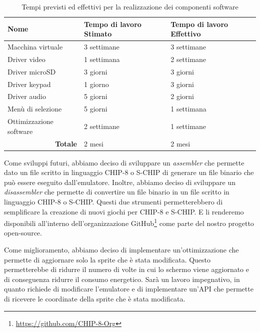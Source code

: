 \documentclass[a4paper]{article}
\begin{document}
\begin{center}
    \begin{table}[ht]
        \centering
        \begin{tabular}{|l|l|l|}
            \hline
            \textbf{Nome}                         & \textbf{Tempo di lavoro Stimato} & \textbf{Tempo di lavoro Effettivo} \\ \hline
            Macchina virtuale                     & 3 settimane                      & 3 settimane                        \\ \hline
            Driver video                          & 1 settimana                      & 2 settimane                        \\ \hline
            Driver microSD                        & 3 giorni                         & 3 giorni                           \\ \hline
            Driver keypad                         & 1 giorno                         & 3 giorni                           \\ \hline
            Driver audio                          & 5 giorni                         & 2 giorni                           \\ \hline
            Menù di selezione                     & 5 giorni                         & 1 settimana                        \\ \hline
            Ottimizzazione software               & 2 settimane                      & 1 settimane                        \\ \hline
            \multicolumn{1}{|r|}{\textbf{Totale}} & 2 mesi                           & 2 mesi                             \\ \hline
        \end{tabular}
        \caption{
            Tempi previsti ed effettivi per la realizzazione dei componenti software
        }
    \end{table}
\end{center}

Come sviluppi futuri, abbiamo deciso di sviluppare un \textit{assembler} che permette dato un file scritto in linguaggio CHIP-8 o S-CHIP di generare un file binario che può essere eseguito dall'emulatore. Inoltre, abbiamo deciso di sviluppare un \textit{disassembler} che permette di convertire un file binario in un file scritto in linguaggio CHIP-8 o S-CHIP. Questi due strumenti permetterebbero di semplificare la creazione di nuovi giochi per CHIP-8 e S-CHIP. E li renderemo disponibili all'interno dell'organizzazione GitHub\footnote{\url{https://github.com/CHIP-8-Org}} come parte del nostro progetto open-source.

Come miglioramento, abbiamo deciso di implementare un'ottimizzazione che permette di aggiornare solo la sprite che è stata modificata. Questo permetterebbe di ridurre il numero di volte in cui lo schermo viene aggiornato e di conseguenza ridurre il consumo energetico. Sarà un lavoro impegnativo, in quanto richiede di modificare l'emulatore e di implementare un'API che permette di ricevere le coordinate della sprite che è stata modificata.



\end{document}
